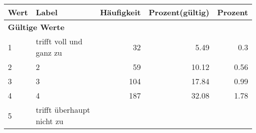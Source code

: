      \begin{longtable}{lXrrr}
     \toprule
     \textbf{Wert} & \textbf{Label} & \textbf{Häufigkeit} & \textbf{Prozent(gültig)} & \textbf{Prozent} \\
     \endhead
     \midrule
     \multicolumn{5}{l}{\textbf{Gültige Werte}}\\

     1 &
     \multicolumn{1}{X}{ trifft voll und ganz zu   } &


       \num{32} &
       \num[round-mode=places,round-precision=2]{5,49} &
         \num[round-mode=places,round-precision=2]{0,3} \\

     2 &
     \multicolumn{1}{X}{ 2   } &


       \num{59} &
       \num[round-mode=places,round-precision=2]{10,12} &
         \num[round-mode=places,round-precision=2]{0,56} \\

     3 &
     \multicolumn{1}{X}{ 3   } &


       \num{104} &
       \num[round-mode=places,round-precision=2]{17,84} &
         \num[round-mode=places,round-precision=2]{0,99} \\

     4 &
     \multicolumn{1}{X}{ 4   } &


       \num{187} &
       \num[round-mode=places,round-precision=2]{32,08} &
         \num[round-mode=places,round-precision=2]{1,78} \\

     5 &
     \multicolumn{1}{X}{ trifft überhaupt nicht zu   } &



\end{longtable}
